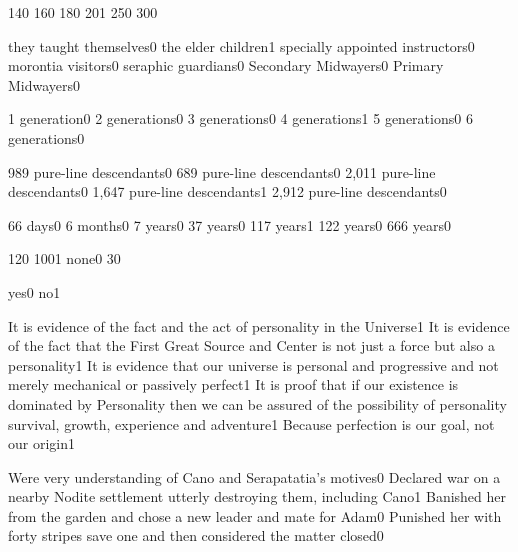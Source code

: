 {14}{0}
{16}{0}
{18}{0}
{20}{1}
{25}{0}
{30}{0}
\qstop

{they taught themselves}{0}
{the elder children}{1}
{specially appointed instructors}{0}
{morontia visitors}{0}
{seraphic guardians}{0}
{Secondary Midwayers}{0}
{Primary Midwayers}{0}
\qstop

{1 generation}{0}
{2 generations}{0}
{3 generations}{0}
{4 generations}{1}
{5 generations}{0}
{6 generations}{0}
\qstop

{989 pure\hyp{}line descendants}{0}
{689 pure\hyp{}line descendants}{0}
{2,011 pure\hyp{}line descendants}{0}
{1,647 pure\hyp{}line descendants}{1}
{2,912 pure\hyp{}line descendants}{0}
\qstop

{66 days}{0}
{6 months}{0}
{7 years}{0}
{37 years}{0}
{117 years}{1}
{122 years}{0}
{666 years}{0}
\qstop

{12}{0}
{100}{1}
{none}{0}
{3}{0}
\qstop


{yes}{0}
{no}{1}
\qstop

{It is evidence of the fact and the act of personality in the Universe}{1}
{It is evidence of the fact that the First Great Source and Center is not just a force but also a personality}{1}
{It is evidence that our universe is personal and progressive and not merely mechanical or passively perfect}{1}
{It is proof that if our existence is dominated by Personality then we can be assured of the possibility of personality survival, growth, experience and adventure}{1}
{Because perfection is our goal, not our origin}{1}
\qstop

{Were very understanding of Cano and Serapatatia's motives}{0}
{Declared war on a nearby Nodite settlement utterly destroying them, including Cano}{1}
{Banished her from the garden and chose a new leader and mate for Adam}{0}
{Punished her with forty stripes save one and then considered the matter closed}{0}
\qstop

